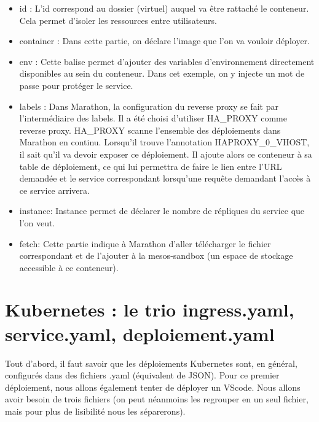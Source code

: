 \documentclass[11pt,fleqn]{book} %
\begin{document}
\begin{itemize}
    \item id : L'id correspond au dossier (virtuel) auquel va être rattaché le conteneur. Cela permet d'isoler les ressources entre utilisateurs.
    \item container : Dans cette partie, on déclare l'image que l'on va vouloir déployer.
    \item env : Cette balise permet d'ajouter des variables d'environnement directement disponibles au sein du conteneur. Dans cet exemple, on y injecte un mot de passe pour protéger le service.   
    \item labels : Dans Marathon, la configuration du reverse proxy se fait par l'intermédiaire des labels. Il a été choisi d'utiliser HA\_PROXY comme reverse proxy. HA\_PROXY scanne l'ensemble des déploiements dans Marathon en continu. Lorsqu'il trouve l'annotation HAPROXY\_0\_VHOST, il sait qu'il va devoir exposer ce déploiement. Il ajoute alors ce conteneur à sa table de déploiement, ce qui lui permettra de faire le lien entre l'URL demandée et le service correspondant lorsqu'une requête demandant l'accès à ce service arrivera.   
    \item instance: Instance permet de déclarer le nombre de répliques du service que l'on veut.
    \item fetch: Cette partie indique à Marathon d'aller télécharger le fichier correspondant et de l'ajouter à la mesos-sandbox (un espace de stockage accessible à ce conteneur).
\end{itemize}
\section*{Kubernetes : le trio ingress.yaml, service.yaml, deploiement.yaml}

Tout d'abord, il faut savoir que les déploiements Kubernetes sont, en général, configurés dans des fichiers .yaml (équivalent de JSON). Pour ce premier déploiement, nous allons également tenter de déployer un VScode. Nous allons avoir besoin de trois fichiers (on peut néanmoins les regrouper en un seul fichier, mais pour plus de lisibilité nous les séparerons). 
\end{document}
